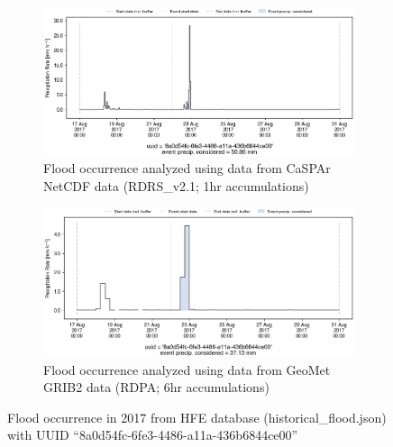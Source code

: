 \documentclass[10pt,a4paper,titlepage,parskip]{scrartcl}
\begin{document}
\begin{figure}[h]
	\begin{subfigure}[a]{1.0\textwidth}
		\centering
		\includegraphics[width=\linewidth]{figures/compare_Geomet_CaSPAr/interpolated_at_stations_occurrence_1464_identified-timesteps_RDRS_v2.1.png}
		\caption{Flood occurrence analyzed using data from CaSPAr NetCDF data (RDRS\_v2.1; 1hr accumulations)}
	\end{subfigure}
	\par\bigskip\bigskip
	\begin{subfigure}[b]{1.0\textwidth}
		\centering
		\includegraphics[width=\linewidth]{figures/compare_Geomet_CaSPAr/interpolated_at_stations_occurrence_1464_identified-timesteps_rdpa_10km_6f.png}
		\caption{Flood occurrence analyzed using data from GeoMet GRIB2 data (RDPA; 6hr accumulations)}
	\end{subfigure}
	\par\bigskip\bigskip
	\caption{Flood occurrence in 2017 from HFE database (historical\_flood.json) with UUID ``8a0d54fc-6fe3-4486-a11a-436b6844ce00''}
\end{figure}
\pagebreak
\end{document}
